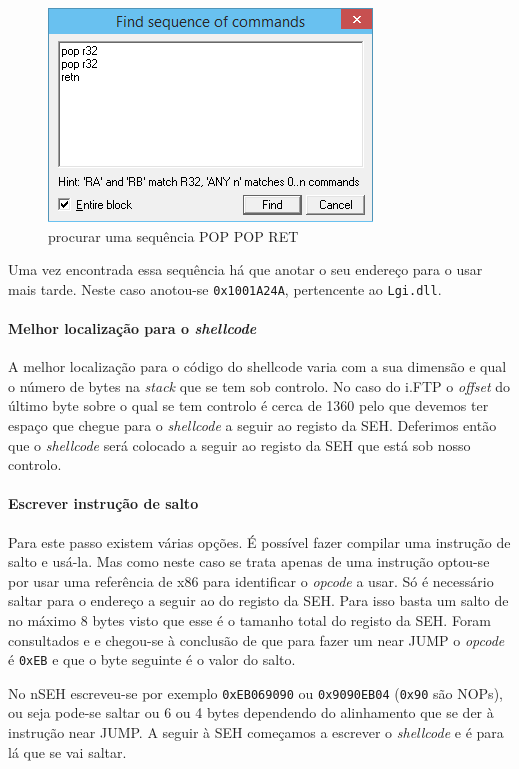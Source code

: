 \documentclass[a4paper]{article}
\begin{document}
\begin{figure}
	\centering
	\includegraphics[scale=1]{find_POPPOPRET}
	\caption{procurar uma sequência POP POP RET}
	\label{find_POPPOPRET}
\end{figure}

Uma vez encontrada essa sequência há que anotar o seu endereço para o usar mais tarde. Neste caso anotou-se \texttt{0x1001A24A}, pertencente ao \texttt{Lgi.dll}.

\paragraph*{Melhor localização para o \textit{shellcode}} A melhor localização para o código do shellcode varia com a sua dimensão e qual o número de bytes na \textit{stack} que se tem sob controlo. No caso do i.FTP o \textit{offset} do último byte sobre o qual se tem controlo é cerca de 1360 pelo que devemos ter espaço que chegue para o \textit{shellcode} a seguir ao registo da SEH. Deferimos então que o \textit{shellcode} será colocado a seguir ao registo da SEH que está sob nosso controlo.

\paragraph*{Escrever instrução de salto} Para este passo existem várias opções. É possível fazer compilar uma instrução de salto e usá-la. Mas como neste caso se trata apenas de uma instrução optou-se por usar uma referência de x86 para identificar o \textit{opcode} a usar. Só é necessário saltar para o endereço a seguir ao do registo da SEH. Para isso basta um salto de no máximo 8 bytes visto que esse é o tamanho total do registo da SEH. Foram consultados \cite{AMD64vol3_2013} e \cite{refx86asm} e chegou-se à conclusão de que para fazer um near JUMP o \textit{opcode} é \texttt{0xEB} e que o byte seguinte é o valor do salto.

No nSEH escreveu-se por exemplo \texttt{0xEB069090} ou \texttt{0x9090EB04} (\texttt{0x90} são NOPs), ou seja pode-se saltar ou 6 ou 4 bytes dependendo do alinhamento que se der à instrução near JUMP. A seguir à SEH começamos a escrever o \textit{shellcode} e é para lá que se vai saltar.
\end{document}
